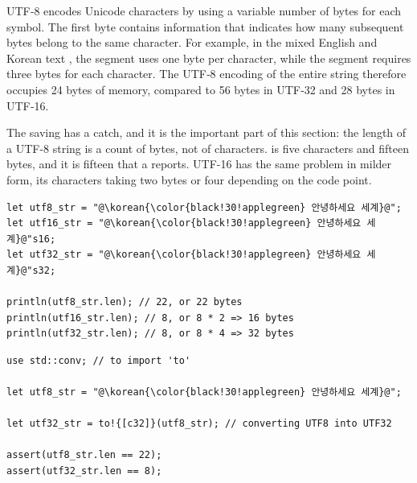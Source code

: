 UTF‑8 encodes Unicode characters by using a variable number of bytes for each
symbol. The first byte contains information that indicates how many subsequent
bytes belong to the same character. For example, in the mixed English and Korean
text \colorbox{background!90!gray!60}{}, the segment \colorbox{background!90!gray!60}{} uses one
byte per character, while the segment \colorbox{background!90!gray!60}{\korean{\color{black!30!applegreen}{"안녕하세요"}}} requires three bytes
for each character. The UTF‑8 encoding of the entire string therefore occupies
24 bytes of memory, compared to 56 bytes in UTF‑32 and 28 bytes in UTF‑16.


The saving has a catch, and it is the important part of this section: the length
of a UTF-8 string is a count of bytes, not of characters.
\colorbox{background!90!gray!60}{\korean{\color{black!30!applegreen}{"안녕하세요"}}} is
five characters and fifteen bytes, and it is fifteen that a \token{\[c8\]}
reports. UTF-16 has the same problem in milder form, its characters taking two
bytes or four depending on the code point.

\begin{lstlisting}[style=coloredverbatim, label=lst:types:encoding_example, caption=Encoding consequence on array length, escapechar=@]
let utf8_str = "@\korean{\color{black!30!applegreen} 안녕하세요 세계}@";
let utf16_str = "@\korean{\color{black!30!applegreen} 안녕하세요 세계}@"s16;
let utf32_str = "@\korean{\color{black!30!applegreen} 안녕하세요 세계}@"s32;

println(utf8_str.len); // 22, or 22 bytes
println(utf16_str.len); // 8, or 8 * 2 => 16 bytes
println(utf32_str.len); // 8, or 8 * 4 => 32 bytes
\end{lstlisting}


\begin{lstlisting}[style=coloredverbatim, label=lst:types:converting_encoding, caption=String encoding conversion, escapechar=@]
use std::conv; // to import 'to'

let utf8_str = "@\korean{\color{black!30!applegreen} 안녕하세요 세계}@";

let utf32_str = to!{[c32]}(utf8_str); // converting UTF8 into UTF32

assert(utf8_str.len == 22);
assert(utf32_str.len == 8);
\end{lstlisting}
